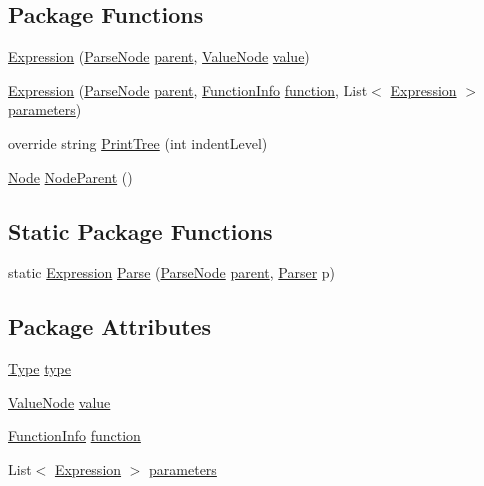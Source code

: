 \subsection*{Package Functions}
\begin{DoxyCompactItemize}
\item 
\hyperlink{a00054_a91f0536300ebb39eaf9b7526c7e97364}{Expression} (\hyperlink{a00077}{Parse\-Node} \hyperlink{a00077_af313a82103fcc2ff5a177dbb06b92f7b}{parent}, \hyperlink{a00101}{Value\-Node} \hyperlink{a00054_a569e516782891544c334ff8131b23108}{value})
\item 
\hyperlink{a00054_ac2a8b8fd554b8006b5e2f1d1ca3cf93e}{Expression} (\hyperlink{a00077}{Parse\-Node} \hyperlink{a00077_af313a82103fcc2ff5a177dbb06b92f7b}{parent}, \hyperlink{a00055}{Function\-Info} \hyperlink{a00054_a9c1859ce5ad4c86ded8dd0d61da61320}{function}, List$<$ \hyperlink{a00054}{Expression} $>$ \hyperlink{a00054_a7b21380bead8ae08b2cfc6594edab32c}{parameters})
\item 
override string \hyperlink{a00054_a509ba6d93218203bae56a5a7a82e8261}{Print\-Tree} (int indent\-Level)
\item 
\hyperlink{a00068}{Node} \hyperlink{a00077_a580e520a29444fc23ac3660cbe514a09}{Node\-Parent} ()
\end{DoxyCompactItemize}
\subsection*{Static Package Functions}
\begin{DoxyCompactItemize}
\item 
static \hyperlink{a00054}{Expression} \hyperlink{a00054_a686da57aaf67d50d2832f9ee0028a979}{Parse} (\hyperlink{a00077}{Parse\-Node} \hyperlink{a00077_af313a82103fcc2ff5a177dbb06b92f7b}{parent}, \hyperlink{a00078}{Parser} p)
\end{DoxyCompactItemize}
\subsection*{Package Attributes}
\begin{DoxyCompactItemize}
\item 
\hyperlink{a00054_aceddb5496ccffe668bced2d131e4bf86}{Type} \hyperlink{a00054_ad55c92df835006328bc2a79a8f91efb9}{type}
\item 
\hyperlink{a00101}{Value\-Node} \hyperlink{a00054_a569e516782891544c334ff8131b23108}{value}
\item 
\hyperlink{a00055}{Function\-Info} \hyperlink{a00054_a9c1859ce5ad4c86ded8dd0d61da61320}{function}
\item 
List$<$ \hyperlink{a00054}{Expression} $>$ \hyperlink{a00054_a7b21380bead8ae08b2cfc6594edab32c}{parameters}
\end{DoxyCompactItemize}
